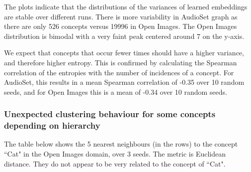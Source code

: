 The plots indicate that the distributions of the variances of learned embeddings are stable over different runs. There is more variability in AudioSet graph as there are only 526 concepts versus 19996 in Open Images. The Open Images distribution is bimodal with a very faint peak centered around 7 on the y-axis. 

 
We expect that concepts that occur fewer times should have a higher variance, and therefore higher entropy. This is confirmed by calculating the Spearman correlation of the entropies with the number of incidences of a concept. For AudioSet, this results in a mean Spearman correlation of -0.35 over 10 random seeds, and for Open Images this is a mean of -0.34 over 10 random seeds. 

%





\subsubsection{Unexpected clustering behaviour for some concepts depending on hierarchy}

The table below shows the 5 nearest neighbours (in the rows) to the concept ``Cat" in the Open Images domain, over 3 seeds. The metric is Euclidean distance. They do not appear to be very related to the concept of ``Cat".

